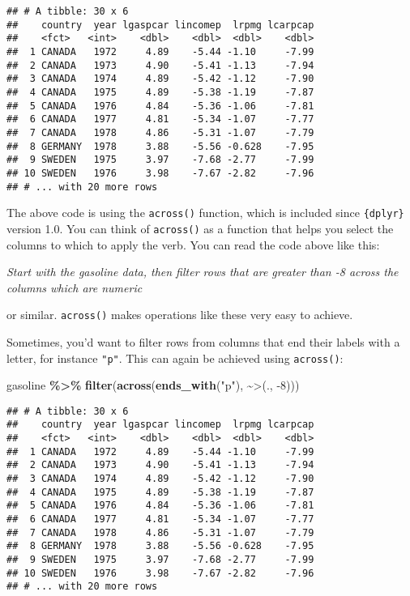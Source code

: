 \documentclass[
]{article}
\newenvironment{Shaded}{\begin{snugshade}}{\end{snugshade}}
\newcommand{\DataTypeTok}[1]{\textcolor[rgb]{0.13,0.29,0.53}{#1}}
\newcommand{\DecValTok}[1]{\textcolor[rgb]{0.00,0.00,0.81}{#1}}
\newcommand{\KeywordTok}[1]{\textcolor[rgb]{0.13,0.29,0.53}{\textbf{#1}}}
\newcommand{\NormalTok}[1]{#1}
\newcommand{\OperatorTok}[1]{\textcolor[rgb]{0.81,0.36,0.00}{\textbf{#1}}}
\newcommand{\StringTok}[1]{\textcolor[rgb]{0.31,0.60,0.02}{#1}}
\begin{document}
\begin{verbatim}
## # A tibble: 30 x 6
##    country  year lgaspcar lincomep  lrpmg lcarpcap
##    <fct>   <int>    <dbl>    <dbl>  <dbl>    <dbl>
##  1 CANADA   1972     4.89    -5.44 -1.10     -7.99
##  2 CANADA   1973     4.90    -5.41 -1.13     -7.94
##  3 CANADA   1974     4.89    -5.42 -1.12     -7.90
##  4 CANADA   1975     4.89    -5.38 -1.19     -7.87
##  5 CANADA   1976     4.84    -5.36 -1.06     -7.81
##  6 CANADA   1977     4.81    -5.34 -1.07     -7.77
##  7 CANADA   1978     4.86    -5.31 -1.07     -7.79
##  8 GERMANY  1978     3.88    -5.56 -0.628    -7.95
##  9 SWEDEN   1975     3.97    -7.68 -2.77     -7.99
## 10 SWEDEN   1976     3.98    -7.67 -2.82     -7.96
## # ... with 20 more rows
\end{verbatim}

The above code is using the \texttt{across()} function, which is included since \texttt{\{dplyr\}} version 1.0. You
can think of \texttt{across()} as a function that helps you select the columns to which to apply the
verb. You can read the code above like this:

\emph{Start with the gasoline data, then filter rows that are greater than -8 across the columns
which are numeric}

or similar. \texttt{across()} makes operations like these very easy to achieve.

Sometimes, you'd want to filter rows from columns that end their labels with a letter, for instance
\texttt{"p"}. This can again be achieved using \texttt{across()}:

\begin{Shaded}
\begin{Highlighting}[]
\NormalTok{gasoline }\OperatorTok{\%\textgreater{}\%}
\StringTok{  }\KeywordTok{filter}\NormalTok{(}\KeywordTok{across}\NormalTok{(}\KeywordTok{ends\_with}\NormalTok{(}\StringTok{"p"}\NormalTok{), }\OperatorTok{\textasciitilde{}}\StringTok{\textasciigrave{}}\DataTypeTok{\textgreater{}}\StringTok{\textasciigrave{}}\NormalTok{(., }\DecValTok{{-}8}\NormalTok{)))}
\end{Highlighting}
\end{Shaded}

\begin{verbatim}
## # A tibble: 30 x 6
##    country  year lgaspcar lincomep  lrpmg lcarpcap
##    <fct>   <int>    <dbl>    <dbl>  <dbl>    <dbl>
##  1 CANADA   1972     4.89    -5.44 -1.10     -7.99
##  2 CANADA   1973     4.90    -5.41 -1.13     -7.94
##  3 CANADA   1974     4.89    -5.42 -1.12     -7.90
##  4 CANADA   1975     4.89    -5.38 -1.19     -7.87
##  5 CANADA   1976     4.84    -5.36 -1.06     -7.81
##  6 CANADA   1977     4.81    -5.34 -1.07     -7.77
##  7 CANADA   1978     4.86    -5.31 -1.07     -7.79
##  8 GERMANY  1978     3.88    -5.56 -0.628    -7.95
##  9 SWEDEN   1975     3.97    -7.68 -2.77     -7.99
## 10 SWEDEN   1976     3.98    -7.67 -2.82     -7.96
## # ... with 20 more rows
\end{verbatim}
\end{document}
